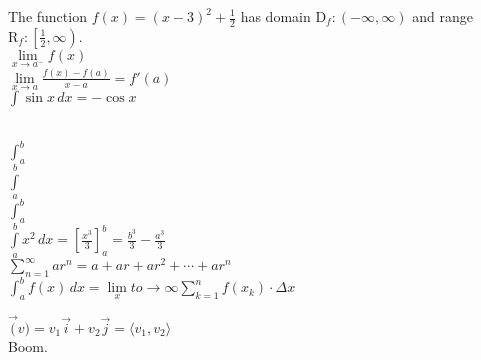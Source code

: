 \documentclass[11pt]{article}
\begin{document}
The function $f(x)=(x-3)^2 +\frac{1}{2}$ has domain $\mathrm{D}_f:(-\infty,\infty)$ and range $\mathrm{R}_f:\left[\frac{1}{2},\infty\right)$. \\

$\lim \limits_{x \to a^-} f(x)$\\

$\displaystyle{\lim \limits_{x \to a} \frac{f(x)-f(a)}{x-a}=f'(a)}$ \\

$\displaystyle{\int \sin x \,dx = -\cos x}$\\\

$\int_a^b$\\

$\int \limits_a^b$\\

$\displaystyle{\int_a^b}$\\

$\displaystyle{\int \limits_a^bx^2\,dx=\left[\frac{x^3}{3}\right]_{a}^{b} = \frac{b^3}{3}-\frac{a^3}{3}}$\\

$\displaystyle{
    \sum \limits_{n=1}^{\infty}ar^n= a + ar + ar^2 + \cdots + ar^n
}$\\

$\displaystyle{
    \int_a^b f(x) \, dx=\lim \limits_x{to \to \infty} \sum \limits_{k=1}^{n} f(x_k) \cdot \Delta x
}$

$\vec(v)=v_1 \vec{i}+v_2 \vec{j}=\langle v_1, v_2 \rangle$ \\

Boom.
\end{document}
